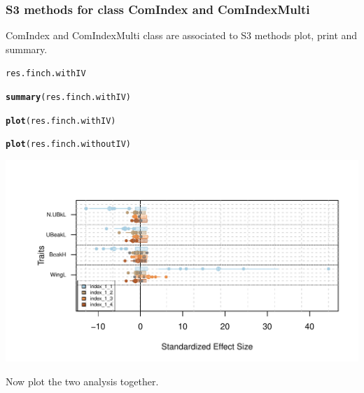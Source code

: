 \documentclass[12pt]{article}\usepackage[]{graphicx}\usepackage[]{color}
\makeatletter
\def\maxwidth{ %
  \ifdim\Gin@nat@width>\linewidth
    \linewidth
  \else
    \Gin@nat@width
  \fi
}
\newcommand{\hlstd}[1]{\textcolor[rgb]{0.345,0.345,0.345}{#1}}%
\newcommand{\hlkwd}[1]{\textcolor[rgb]{0.737,0.353,0.396}{\textbf{#1}}}%
\newenvironment{kframe}{%
 \def\at@end@of@kframe{}%
 \ifinner\ifhmode%
  \def\at@end@of@kframe{\end{minipage}}%
  \begin{minipage}{\columnwidth}%
 \fi\fi%
 \def\FrameCommand##1{\hskip\@totalleftmargin \hskip-\fboxsep
 \colorbox{shadecolor}{##1}\hskip-\fboxsep
     \hskip-\linewidth \hskip-\@totalleftmargin \hskip\columnwidth}%
 \MakeFramed {\advance\hsize-\width
   \@totalleftmargin\z@ \linewidth\hsize
   \@setminipage}}%
 {\par\unskip\endMakeFramed%
 \at@end@of@kframe}
\newenvironment{knitrout}{}{} %
\makeatother
\begin{document}
\subsubsection{S3 methods for class ComIndex and ComIndexMulti}
ComIndex and ComIndexMulti class are associated to S3 methods plot, print and summary.

\begin{knitrout}
\color{fgcolor}\begin{kframe}
\begin{alltt}
\hlstd{res.finch.withIV}
\end{alltt}


{\ttfamily\noindent\bfseries\color{errorcolor}{\#\# Error: objet 'res.finch.withIV' introuvable}}\begin{alltt}
\hlkwd{summary}\hlstd{(res.finch.withIV)}
\end{alltt}


{\ttfamily\noindent\bfseries\color{errorcolor}{\#\# Error: objet 'res.finch.withIV' introuvable}}\begin{alltt}
\hlkwd{plot}\hlstd{(res.finch.withIV)}
\end{alltt}


{\ttfamily\noindent\bfseries\color{errorcolor}{\#\# Error: objet 'res.finch.withIV' introuvable}}\begin{alltt}
\hlkwd{plot}\hlstd{(res.finch.withoutIV)}
\end{alltt}
\end{kframe}

{\centering \includegraphics[width=\maxwidth]{figure/unnamed-chunk-46} 

}



\end{knitrout}
Now plot the two analysis together.
\end{document}
